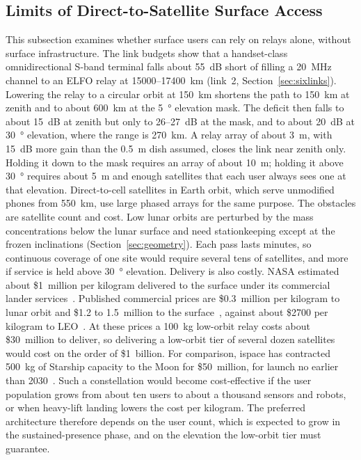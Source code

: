\documentclass{IEEEoj}
\begin{document}
\subsection{Limits of Direct-to-Satellite Surface Access}
This subsection examines whether surface users can rely on relays alone, without surface infrastructure. The link budgets show that a handset-class omnidirectional S-band terminal falls about \SI{55}{dB} short of filling a \SI{20}{MHz} channel to an ELFO relay at \SI{15000}{}--\SI{17400}{km} (link~2, Section~\ref{sec:sixlinks}). Lowering the relay to a circular orbit at \SI{150}{km} shortens the path to \SI{150}{km} at zenith and to about \SI{600}{km} at the \SI{5}{\degree} elevation mask. The deficit then falls to about \SI{15}{dB} at zenith but only to \SI{26}{}--\SI{27}{dB} at the mask, and to about \SI{20}{dB} at \SI{30}{\degree} elevation, where the range is \SI{270}{km}. A relay array of about \SI{3}{m}, with \SI{15}{dB} more gain than the \SI{0.5}{m} dish assumed, closes the link near zenith only. Holding it down to the mask requires an array of about \SI{10}{m}; holding it above \SI{30}{\degree} requires about \SI{5}{m} and enough satellites that each user always sees one at that elevation. Direct-to-cell satellites in Earth orbit, which serve unmodified phones from \SI{550}{km}, use large phased arrays for the same purpose. The obstacles are satellite count and cost. Low lunar orbits are perturbed by the mass concentrations below the lunar surface and need stationkeeping except at the frozen inclinations (Section~\ref{sec:geometry}). Each pass lasts minutes, so continuous coverage of one site would require several tens of satellites, and more if service is held above \SI{30}{\degree} elevation. Delivery is also costly. NASA estimated about \$1~million per kilogram delivered to the surface under its commercial lander services~\cite{oig2024clps}. Published commercial prices are \$0.3~million per kilogram to lunar orbit and \$1.2 to 1.5~million to the surface~\cite{astrobotic2021pug,ispace2024brief}, against about \$2700 per kilogram to LEO~\cite{jones2018launch}. At these prices a \SI{100}{kg} low-orbit relay costs about \$30~million to deliver, so delivering a low-orbit tier of several dozen satellites would cost on the order of \$1~billion. For comparison, ispace has contracted \SI{500}{kg} of Starship capacity to the Moon for \$50~million, for launch no earlier than 2030~\cite{ispace2026starship}. Such a constellation would become cost-effective if the user population grows from about ten users to about a thousand sensors and robots, or when heavy-lift landing lowers the cost per kilogram. The preferred architecture therefore depends on the user count, which is expected to grow in the sustained-presence phase, and on the elevation the low-orbit tier must guarantee.
\end{document}

